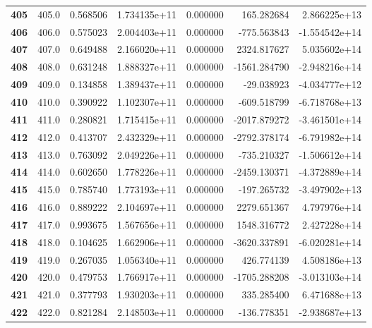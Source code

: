\documentclass{report}[12pt]
\begin{document}
\begin{center}
\begin{tabular}{lrrrrrr}
\textbf{405 } &          405.0 &   0.568506 &  1.734135e+11 &    0.000000 &   165.282684 &  2.866225e+13 \\
\textbf{406 } &          406.0 &   0.575023 &  2.004403e+11 &    0.000000 &  -775.563843 & -1.554542e+14 \\
\textbf{407 } &          407.0 &   0.649488 &  2.166020e+11 &    0.000000 &  2324.817627 &  5.035602e+14 \\
\textbf{408 } &          408.0 &   0.631248 &  1.888327e+11 &    0.000000 & -1561.284790 & -2.948216e+14 \\
\textbf{409 } &          409.0 &   0.134858 &  1.389437e+11 &    0.000000 &   -29.038923 & -4.034777e+12 \\
\textbf{410 } &          410.0 &   0.390922 &  1.102307e+11 &    0.000000 &  -609.518799 & -6.718768e+13 \\
\textbf{411 } &          411.0 &   0.280821 &  1.715415e+11 &    0.000000 & -2017.879272 & -3.461501e+14 \\
\textbf{412 } &          412.0 &   0.413707 &  2.432329e+11 &    0.000000 & -2792.378174 & -6.791982e+14 \\
\textbf{413 } &          413.0 &   0.763092 &  2.049226e+11 &    0.000000 &  -735.210327 & -1.506612e+14 \\
\textbf{414 } &          414.0 &   0.602650 &  1.778226e+11 &    0.000000 & -2459.130371 & -4.372889e+14 \\
\textbf{415 } &          415.0 &   0.785740 &  1.773193e+11 &    0.000000 &  -197.265732 & -3.497902e+13 \\
\textbf{416 } &          416.0 &   0.889222 &  2.104697e+11 &    0.000000 &  2279.651367 &  4.797976e+14 \\
\textbf{417 } &          417.0 &   0.993675 &  1.567656e+11 &    0.000000 &  1548.316772 &  2.427228e+14 \\
\textbf{418 } &          418.0 &   0.104625 &  1.662906e+11 &    0.000000 & -3620.337891 & -6.020281e+14 \\
\textbf{419 } &          419.0 &   0.267035 &  1.056340e+11 &    0.000000 &   426.774139 &  4.508186e+13 \\
\textbf{420 } &          420.0 &   0.479753 &  1.766917e+11 &    0.000000 & -1705.288208 & -3.013103e+14 \\
\textbf{421 } &          421.0 &   0.377793 &  1.930203e+11 &    0.000000 &   335.285400 &  6.471688e+13 \\
\textbf{422 } &          422.0 &   0.821284 &  2.148503e+11 &    0.000000 &  -136.778351 & -2.938687e+13 \\

\end{tabular}
\end{center}
\end{document}
